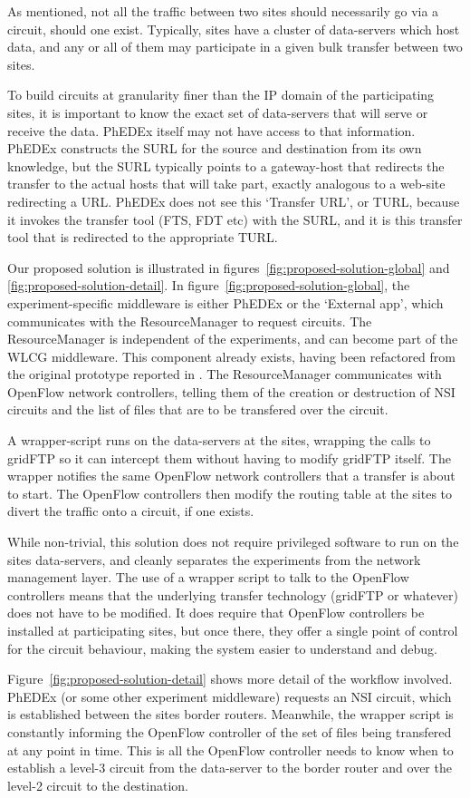 As mentioned, not all the traffic between two sites should necessarily go via a circuit, should one exist. Typically, sites have a cluster of data-servers which host data, and any or all of them may participate in a given bulk transfer between two sites.

To build circuits at granularity finer than the IP domain of the participating sites, it is important to know the exact set of data-servers that will serve or receive the data. PhEDEx itself may not have access to that information. PhEDEx constructs the SURL for the source and destination from its own knowledge, but the SURL typically points to a gateway-host that redirects the transfer to the actual hosts that will take part, exactly analogous to a web-site redirecting a URL. PhEDEx does not see this `Transfer URL', or TURL, because it invokes the transfer tool (FTS, FDT etc) with the SURL, and it is this transfer tool that is redirected to the appropriate TURL.

Our proposed solution is illustrated in figures~\ref{fig:proposed-solution-global} and \ref{fig:proposed-solution-detail}. In figure~\ref{fig:proposed-solution-global}, the experiment-specific middleware is either PhEDEx or the `External app', which communicates with the ResourceManager to request circuits. The ResourceManager is independent of the experiments, and can become part of the WLCG middleware. This component already exists, having been refactored from the original prototype reported in \cite{ANSE_ISGC_2014}. The ResourceManager communicates with OpenFlow network controllers, telling them of the creation or destruction of NSI circuits and the list of files that are to be transfered over the circuit.

A wrapper-script runs on the data-servers at the sites, wrapping the calls to gridFTP so it can intercept them without having to modify gridFTP itself. The wrapper notifies the same OpenFlow network controllers that a transfer is about to start. The OpenFlow controllers then modify the routing table at the sites to divert the traffic onto a circuit, if one exists.

While non-trivial, this solution does not require privileged software to run on the sites data-servers, and cleanly separates the experiments from the network management layer. The use of a wrapper script to talk to the OpenFlow controllers means that the underlying transfer technology (gridFTP or whatever) does not have to be modified. It does require that OpenFlow controllers be installed at participating sites, but once there, they offer a single point of control for the circuit behaviour, making the system easier to understand and debug.

Figure~\ref{fig:proposed-solution-detail} shows more detail of the workflow involved. PhEDEx (or some other experiment middleware) requests an NSI circuit, which is established between the sites border routers. Meanwhile, the wrapper script is constantly informing the OpenFlow controller of the set of files being transfered at any point in time. This is all the OpenFlow controller needs to know when to establish a level-3 circuit from the data-server to the border router and over the level-2 circuit to the destination.